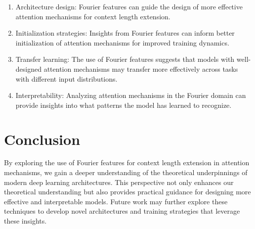 \documentclass{article}
\begin{document}
\begin{enumerate}
    \item Architecture design: Fourier features can guide the design of more effective attention mechanisms for context length extension.
    \item Initialization strategies: Insights from Fourier features can inform better initialization of attention mechanisms for improved training dynamics.
    \item Transfer learning: The use of Fourier features suggests that models with well-designed attention mechanisms may transfer more effectively across tasks with different input distributions.
    \item Interpretability: Analyzing attention mechanisms in the Fourier domain can provide insights into what patterns the model has learned to recognize.
\end{enumerate}

\section{Conclusion}

By exploring the use of Fourier features for context length extension in attention mechanisms, we gain a deeper understanding of the theoretical underpinnings of modern deep learning architectures. This perspective not only enhances our theoretical understanding but also provides practical guidance for designing more effective and interpretable models. Future work may further explore these techniques to develop novel architectures and training strategies that leverage these insights.



\end{document}
